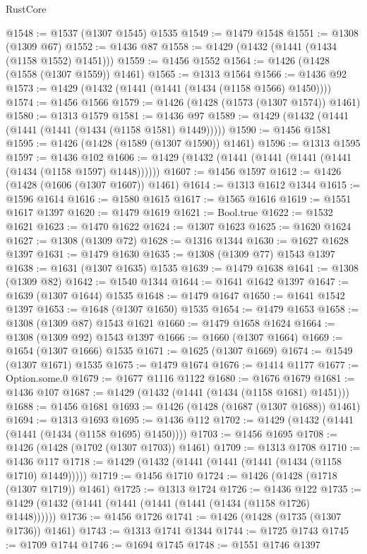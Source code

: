 \begin{lexlean}{RustCore}
\begin{coremodule}
@1548 := @1537 (@1307 @1545) @1535
@1549 := @1479 @1548
@1551 := @1308 (@1309 @67)
@1552 := @1436 @87
@1558 := @1429 (@1432 (@1441 (@1434 (@1158 @1552) @1451)))
@1559 := @1456 @1552
@1564 := @1426 (@1428 (@1558 (@1307 @1559)) @1461)
@1565 := @1313 @1564
@1566 := @1436 @92
@1573 := @1429 (@1432 (@1441 (@1441 (@1434 (@1158 @1566) @1450))))
@1574 := @1456 @1566
@1579 := @1426 (@1428 (@1573 (@1307 @1574)) @1461)
@1580 := @1313 @1579
@1581 := @1436 @97
@1589 := @1429 (@1432 (@1441 (@1441 (@1441 (@1434 (@1158 @1581) @1449)))))
@1590 := @1456 @1581
@1595 := @1426 (@1428 (@1589 (@1307 @1590)) @1461)
@1596 := @1313 @1595
@1597 := @1436 @102
@1606 := @1429 (@1432 (@1441 (@1441 (@1441 (@1441 (@1434 (@1158 @1597) @1448))))))
@1607 := @1456 @1597
@1612 := @1426 (@1428 (@1606 (@1307 @1607)) @1461)
@1614 := @1313 @1612 @1344
@1615 := @1596 @1614
@1616 := @1580 @1615
@1617 := @1565 @1616
@1619 := @1551 @1617 @1397
@1620 := @1479 @1619
@1621 := Bool.true
@1622 := @1532 @1621
@1623 := @1470 @1622
@1624 := @1307 @1623
@1625 := @1620 @1624
@1627 := @1308 (@1309 @72)
@1628 := @1316 @1344
@1630 := @1627 @1628 @1397
@1631 := @1479 @1630
@1635 := @1308 (@1309 @77) @1543 @1397
@1638 := @1631 (@1307 @1635) @1535
@1639 := @1479 @1638
@1641 := @1308 (@1309 @82)
@1642 := @1540 @1344
@1644 := @1641 @1642 @1397
@1647 := @1639 (@1307 @1644) @1535
@1648 := @1479 @1647
@1650 := @1641 @1542 @1397
@1653 := @1648 (@1307 @1650) @1535
@1654 := @1479 @1653
@1658 := @1308 (@1309 @87) @1543 @1621
@1660 := @1479 @1658 @1624
@1664 := @1308 (@1309 @92) @1543 @1397
@1666 := @1660 (@1307 @1664)
@1669 := @1654 (@1307 @1666) @1535
@1671 := @1625 (@1307 @1669)
@1674 := @1549 (@1307 @1671) @1535
@1675 := @1479 @1674
@1676 := @1414 @1177
@1677 := Option.some.{0}
@1679 := @1677 @1116 @1122
@1680 := @1676 @1679
@1681 := @1436 @107
@1687 := @1429 (@1432 (@1441 (@1434 (@1158 @1681) @1451)))
@1688 := @1456 @1681
@1693 := @1426 (@1428 (@1687 (@1307 @1688)) @1461)
@1694 := @1313 @1693
@1695 := @1436 @112
@1702 := @1429 (@1432 (@1441 (@1441 (@1434 (@1158 @1695) @1450))))
@1703 := @1456 @1695
@1708 := @1426 (@1428 (@1702 (@1307 @1703)) @1461)
@1709 := @1313 @1708
@1710 := @1436 @117
@1718 := @1429 (@1432 (@1441 (@1441 (@1441 (@1434 (@1158 @1710) @1449)))))
@1719 := @1456 @1710
@1724 := @1426 (@1428 (@1718 (@1307 @1719)) @1461)
@1725 := @1313 @1724
@1726 := @1436 @122
@1735 := @1429 (@1432 (@1441 (@1441 (@1441 (@1441 (@1434 (@1158 @1726) @1448))))))
@1736 := @1456 @1726
@1741 := @1426 (@1428 (@1735 (@1307 @1736)) @1461)
@1743 := @1313 @1741 @1344
@1744 := @1725 @1743
@1745 := @1709 @1744
@1746 := @1694 @1745
@1748 := @1551 @1746 @1397

\end{coremodule}
\end{lexlean}
